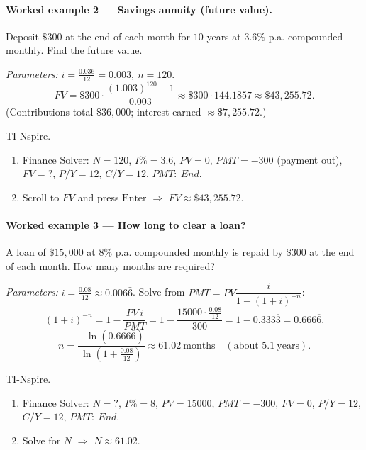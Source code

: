 \documentclass[11pt]{article}
\def\textbf#1{#1}%
\def\mathrm#1{#1}%
\begin{document}
\paragraph*{Worked example 2 — Savings annuity (future value).}
Deposit \(\$300\) at the end of each month for \(10\) years at \(3.6\%\) p.a. compounded monthly.
Find the future value.

\emph{Parameters:} \(i=\frac{0.036}{12}=0.003,\ n=120\).
\[
\mathrm{FV}=\$300\cdot\frac{(1.003)^{120}-1}{0.003}
\approx \$300\cdot 144.1857
\approx \boxed{\$43{,}255.72}.
\]
(Contributions total \(\$36{,}000\); interest earned \(\approx \$7{,}255.72\).)

\textbf{TI-Nspire.}
\begin{enumerate}[itemsep=1pt]
  \item Finance Solver: \(\textbf{N}=120\), \(\textbf{I\%}=3.6\),
        \(\textbf{PV}=0\), \(\textbf{PMT}=-300\) (payment out),
        \(\textbf{FV}=?\), \(\textbf{P/Y}=12\), \(\textbf{C/Y}=12\), \(\textbf{PMT:\ End}\).
  \item Scroll to \(FV\) and press \(\text{Enter}\) \(\Rightarrow\) \(FV\approx \$43{,}255.72\).
\end{enumerate}

\paragraph*{Worked example 3 — How long to clear a loan?}
A loan of \(\$15{,}000\) at \(8\%\) p.a. compounded monthly is repaid by
\(\$300\) at the end of each month. How many months are required?

\emph{Parameters:} \(i=\frac{0.08}{12}\approx 0.006\bar{6}\).
Solve from \(\mathrm{PMT}=\mathrm{PV}\dfrac{i}{1-(1+i)^{-n}}\):
\[
(1+i)^{-n}=1-\frac{\mathrm{PV}\,i}{\mathrm{PMT}}
=1-\frac{15000\cdot\frac{0.08}{12}}{300}
=1-0.333\overline{3}=0.666\overline{6}.
\]
\[
n=\frac{-\ln(0.666\overline{6})}{\ln(1+\tfrac{0.08}{12})}\approx \boxed{61.02\ \text{months}}
\quad(\text{about }5.1\ \text{years}).
\]

\textbf{TI-Nspire.}
\begin{enumerate}[itemsep=1pt]
  \item Finance Solver: \(\textbf{N}=?\), \(\textbf{I\%}=8\),
        \(\textbf{PV}=15000\), \(\textbf{PMT}=-300\), \(\textbf{FV}=0\),
        \(\textbf{P/Y}=12\), \(\textbf{C/Y}=12\), \(\textbf{PMT:\ End}\).
  \item Solve for \(N\) \(\Rightarrow\) \(N\approx 61.02\).
\end{enumerate}
\end{document}
